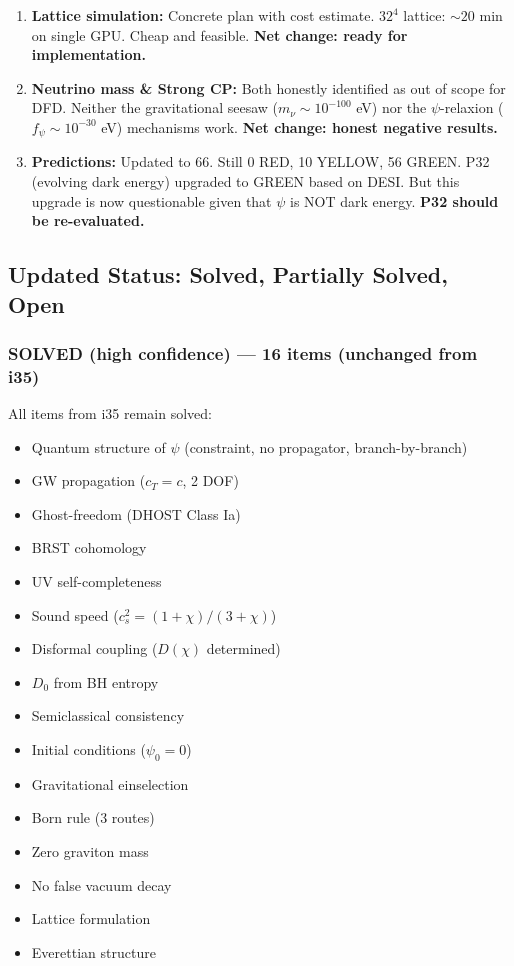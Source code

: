 \documentclass[11pt,a4paper]{article}
\begin{document}
\begin{enumerate}
\item \textbf{Lattice simulation:} Concrete plan with cost estimate. $32^4$ lattice: $\sim 20$ min on single GPU. Cheap and feasible. \textbf{Net change: ready for implementation.}

\item \textbf{Neutrino mass \& Strong CP:} Both honestly identified as out of scope for DFD. Neither the gravitational seesaw ($m_\nu \sim 10^{-100}$ eV) nor the $\psi$-relaxion ($f_\psi \sim 10^{-30}$ eV) mechanisms work. \textbf{Net change: honest negative results.}

\item \textbf{Predictions:} Updated to 66. Still 0 RED, 10 YELLOW, 56 GREEN. P32 (evolving dark energy) upgraded to GREEN based on DESI. But this upgrade is now questionable given that $\psi$ is NOT dark energy. \textbf{P32 should be re-evaluated.}
\end{enumerate}

\subsection{Updated Status: Solved, Partially Solved, Open}

\subsubsection{SOLVED (high confidence) --- 16 items (unchanged from i35)}

All items from i35 remain solved:
\begin{itemize}
\item Quantum structure of $\psi$ (constraint, no propagator, branch-by-branch)
\item GW propagation ($c_T = c$, 2 DOF)
\item Ghost-freedom (DHOST Class Ia)
\item BRST cohomology
\item UV self-completeness
\item Sound speed ($c_s^2 = (1+\chi)/(3+\chi)$)
\item Disformal coupling ($D(\chi)$ determined)
\item $D_0$ from BH entropy
\item Semiclassical consistency
\item Initial conditions ($\psi_0 = 0$)
\item Gravitational einselection
\item Born rule (3 routes)
\item Zero graviton mass
\item No false vacuum decay
\item Lattice formulation
\item Everettian structure
\end{itemize}
\end{document}
